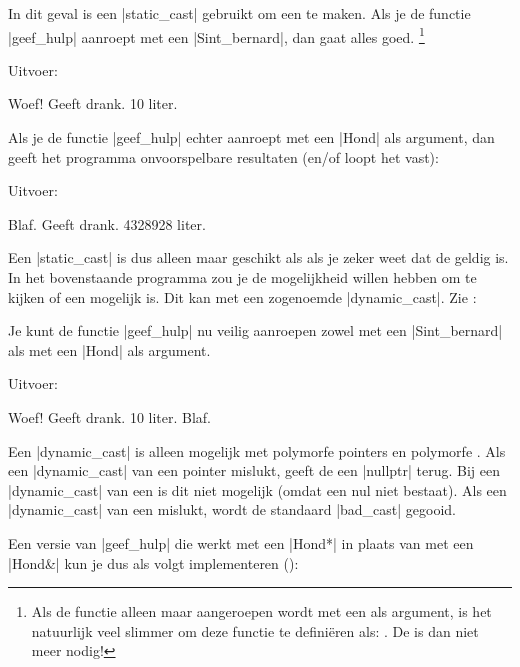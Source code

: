 \begin{cpplstShortInline}
In dit geval is een |static_cast| gebruikt om een  te maken.
Als je de functie |geef_hulp| aanroept met een |Sint_bernard|, dan gaat alles goed.%
\footnote{%
    Als de functie  alleen maar aangeroepen wordt met een  als argument, is het natuurlijk veel slimmer om deze functie te definiëren als: . 
    De  is dan niet meer nodig!
}


Uitvoer:
\begin{coutput}
Woef!
Geeft drank.
10 liter.
\end{coutput}

Als je de functie |geef_hulp| echter aanroept met een |Hond| als argument, dan geeft het programma onvoorspelbare resultaten (en/of loopt het vast):

Uitvoer:
\begin{coutput}
Blaf.
Geeft drank.
4328928 liter.
\end{coutput}

Een |static_cast| is dus alleen maar geschikt als  als je zeker weet dat de  geldig is. 
In het bovenstaande programma zou je de mogelijkheid willen hebben om te kijken of een  mogelijk is.
Dit kan met een zogenoemde |dynamic_cast|. Zie :

Je kunt de functie |geef_hulp| nu veilig aanroepen zowel met een |Sint_bernard| als met een |Hond| als argument.


Uitvoer:
\begin{coutput}
Woef!
Geeft drank.
10 liter.
Blaf.
\end{coutput}

Een |dynamic_cast| is alleen mogelijk met polymorfe pointers en polymorfe .
Als een |dynamic_cast| van een pointer mislukt, geeft de  een |nullptr| terug.
Bij een |dynamic_cast| van een  is dit niet mogelijk (omdat een nul  niet bestaat).
Als een |dynamic_cast| van een  mislukt, wordt de standaard  |bad_cast| gegooid.

Een versie van |geef_hulp| die werkt met een |Hond*| in plaats van met een |Hond&| kun je dus als volgt implementeren ():


\end{cpplstShortInline}
